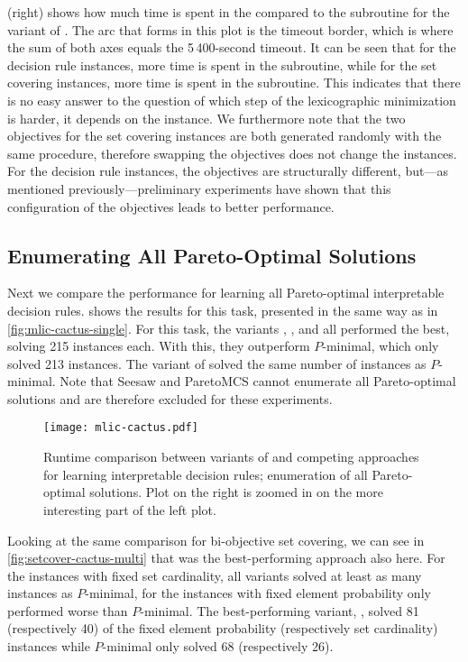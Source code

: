  (right) shows how much time is spent in the \Min{} compared to the \Simpr{} subroutine for the \msh{} variant of \algname{}.
The arc that forms in this plot is the timeout border, which is where the sum of both axes equals the 5\,400-second timeout.
It can be seen that for the decision rule instances, more time is spent in the \Simpr{} subroutine, while for the set covering instances, more time is spent in the \Min{} subroutine.
This indicates that there is no easy answer to the question of which step of the lexicographic minimization is harder, it depends on the instance.
We furthermore note that the two objectives for the set covering instances are both generated randomly with the same procedure, therefore swapping the objectives does not change the instances.
For the decision rule instances, the objectives are structurally different, but---as mentioned previously---preliminary experiments have shown that this configuration of the objectives leads to better performance.

\subsection{Enumerating All Pareto-Optimal Solutions}

Next we compare the performance for learning all Pareto-optimal interpretable decision rules.
 shows the results for this task, presented in the same way as in \cref{fig:mlic-cactus-single}.
For this task, the \algname{} variants \satunsat{}, \unsatsat{}, \msu{} and \msh{} all performed the best, solving 215 instances each.
With this, they outperform $P$-minimal, which only solved 213 instances.
The \oll{} variant of \algname{} solved the same number of instances as $P$-minimal.
Note that Seesaw and ParetoMCS cannot enumerate all Pareto-optimal solutions and are therefore excluded for these experiments.

\begin{figure}
  \centering
  \texttt{[image: mlic-cactus.pdf]}
  \caption{Runtime comparison between variants of \algname{} and competing approaches for learning interpretable decision rules;
    enumeration of all Pareto-optimal solutions.
    Plot on the right is zoomed in on the more interesting part of the left plot.
  }\label{fig:mlic-cactus-multi}
\end{figure}

Looking at the same comparison for bi-objective set covering, we can see in \cref{fig:setcover-cactus-multi} that \msh{} was the best-performing approach also here.
For the instances with fixed set cardinality, all \algname{} variants solved at least as many instances as $P$-minimal, for the instances with fixed element probability only \oll{} performed worse than $P$-minimal.
The best-performing variant, \msh{}, solved 81 (respectively 40) of the fixed element probability (respectively set cardinality) instances while $P$-minimal only solved 68 (respectively 26).

